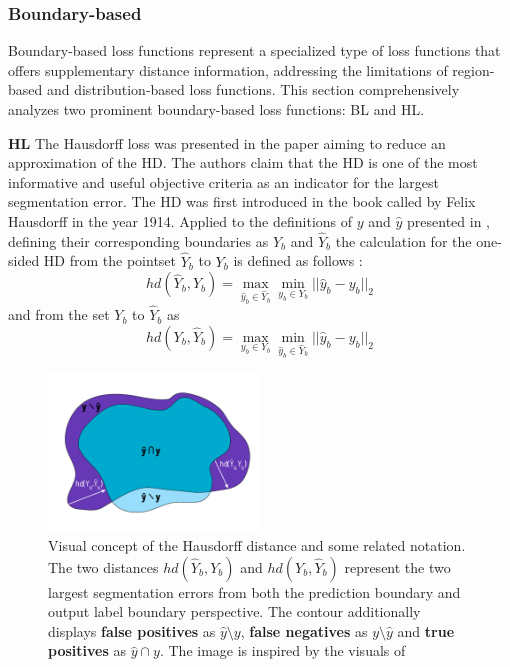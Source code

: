 \subsubsection*{Boundary-based}
\label{boundary_based}
Boundary-based loss functions represent a specialized type of loss functions that offers supplementary distance information, addressing the limitations of region-based and distribution-based loss functions. This section comprehensively analyzes two prominent boundary-based loss functions: \ac{BL} and \ac{HL}.

\textbf{\acf{HL}}\newline
\label{subsubsec:hausdorff_loss}
The Hausdorff loss was presented in the paper \cite{8767031} aiming to reduce an approximation of the \ac{HD}. The authors claim that the \ac{HD} is one of the most informative and useful objective criteria as an indicator for the largest segmentation error. The \ac{HD} was first introduced in the book called  by Felix Hausdorff in the year 1914. Applied to the definitions of $y$ and $\hat{y}$ presented in , defining their corresponding boundaries as $Y_b$ and $\hat{Y}_b$ the calculation for the one-sided \ac{HD} from the pointset $\hat{Y}_b$ to $Y_b$ is defined as follows \cite{rockafellar2009variational}:
\begin{equation}
    hd(\hat{Y}_b,Y_b)=\mathop{\max}_{\hat{y}_b \in \hat{Y}_b}\mathop{\min}_{y_b \in Y_b}||\hat{y}_b - y_b||_2
\end{equation}
and from the set $Y_b$ to $\hat{Y}_b$ as
\begin{equation}
    hd(Y_b,\hat{Y}_b)=\mathop{\max}_{y_b \in Y_b}\mathop{\min}_{\hat{y}_b \in \hat{Y}_b}||\hat{y}_b - y_b||_2
\end{equation}
\begin{figure}[H]%
    \centering
    \includegraphics[width=0.5\textwidth]{images/Hausdorff_distance.png}
    \caption[Hausdorff distance]{Visual concept of the Hausdorff distance and some related notation. The two distances $hd(\hat{Y}_b,Y_b)$ and $hd(Y_b,\hat{Y}_b)$ represent the two largest segmentation errors from both the prediction boundary and output label boundary perspective. The contour additionally displays \textbf{\textcolor{rwucyan40}{false positives}} as $\hat{y}\setminus y$, \textbf{\textcolor{rwuviolet}{false negatives}} as $y\setminus\hat{y}$ and \textbf{\textcolor{rwucyan}{true positives}} as $\hat{y}\cap y$. The image is inspired by the visuals of \cite{8767031}}
    \label{Hausdorff_distance}
\end{figure}
